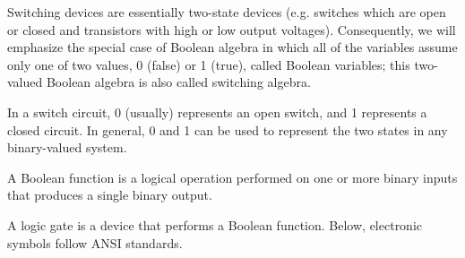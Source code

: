 \documentclass[a4paper,12pt]{article}
\begin{document}
Switching devices are essentially two-state devices (e.g. switches which are open or closed and transistors with high or low output voltages). Consequently, we will emphasize the special case of Boolean algebra in which all of the variables assume only one of two values, 0 (false) or 1 (true), called Boolean variables; this two-valued Boolean algebra is also called switching algebra.

In a switch circuit, 0 (usually) represents an open switch, and 1 represents a closed circuit. In general, 0 and 1 can be used to represent the two states in any binary-valued system.

A Boolean function is a logical operation performed on one or more binary inputs that produces a single binary output.

A logic gate is a device that performs a Boolean function. Below, electronic symbols follow ANSI standards.
\end{document}
